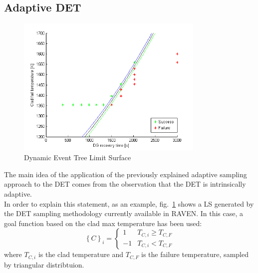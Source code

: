 \subsection{Adaptive DET} 
\label{sec:ADET}
\begin{figure}[h]
  \centering
     \includegraphics[width=0.8\textwidth]{figures/DET_LS_pb.png}
  \caption{Dynamic Event Tree Limit Surface}
  \label{fig:LSDET}
\end{figure}
The main idea of the application of the previously explained adaptive sampling approach to the DET comes from the observation that the DET is intrinsically adaptive.
\\ In order to explain this statement, as an example, fig.~\ref{fig:LSDET} shows a LS generated by the DET sampling methodology currently available in RAVEN. In this case, a goal function based on the clad max temperature has been used:
\begin{equation}
\left \{ C \right \}_{i}=\left \{ \begin{matrix}
1 & T_{C,i}\geq T_{C,F}\\ 
-1 & T_{C,i}<  T_{C,F}
\end{matrix} \right.
\end{equation}
where $T_{C,i}$ is the clad temperature and $T_{C,F}$ is the failure temperature, sampled by triangular distribtuion.
